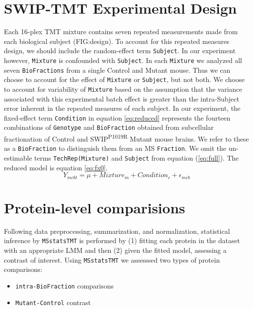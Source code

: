 \documentclass[11pt]{elife}\usepackage[]{graphicx}\usepackage[]{color}
\begin{document}
\section{SWIP-TMT Experimental Design}

Each 16-plex TMT mixture contains seven repeated measurements made from each
biological subject (FIG:design).  To account for this repeated measures
design, we should include the random-effect term \texttt{Subject}.
In our experiment however, \texttt{Mixture} is confounded with \texttt{Subject}.
In each \texttt{Mixture} we analyzed all seven \texttt{BioFractions} from a
single Control and Mutant mouse. Thus we can choose to
account for the effect of \texttt{Mixture} or \texttt{Subject}, but not both. We
choose to account for variability of \texttt{Mixture} based on the assumption
that the variance associated with this experimental batch effect is greater than
the intra-Subject error inherent in the repeated measures of each subject.
In our experiment, the fixed-effect term \texttt{Condition} in equation
\ref{eq:reduced} represents the fourteen combinations of \texttt{Genotype} and
\texttt{BioFraction} obtained from subcellular fractionation of Control and
SWIP\textsuperscript{P1019R} Mutant mouse brains. We refer to these as a
\texttt{BioFraction} to distinguish them from an MS \texttt{Fraction}. 
We omit the un-estimable terms \texttt{TechRep(Mixture)} and \texttt{Subject}
from equation (\ref{eq:full}). The reduced model is equation \ref{eq:fx0}.
\begin{equation}
	\label{eq:fx0}
	Y_{mcbt} = \mu + Mixture_m + Condition_c + \epsilon_{mcb}
\end{equation}


\section{Protein-level comparisions}

Following data preprocessing, summarization, and normalization, statistical
inference by \texttt{MSstatsTMT} is performed by (1) fitting each protein in the
dataset with an appropriate LMM and then (2) given the fitted model, assessing a
contrast of interest. Using \texttt{MSstatsTMT} we assesssed two types of
protein comparisons:
\begin{itemize}
	\item \texttt{intra-BioFraction} comparisons
	\item \texttt{Mutant-Control} contrast
\end{itemize}
\end{document}
